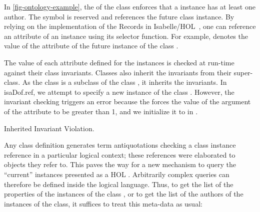 \begin{isabellebody}
\begin{isamarkuptext}
  In \autoref{fig-ontology-example}, the  of the class  
  enforces that a  instance has at least one author.
  The \isa{{\isasymsigma}} symbol is reserved and references the future class instance.
  By relying on the implementation of the Records
  in Isabelle/HOL~\cite{wenzel:isabelle-isar:2020},
  one can reference an attribute of an instance using its selector function.
  For example,  denotes the value
  of the attribute 
  of the future instance of the class .
\end{isamarkuptext}\isamarkuptrue%

\begin{isamarkuptext}
The value of each attribute defined for the instances is checked at run-time
  against their class invariants.
  Classes also inherit the invariants from their super-class.
  As the class  is a subclass
  of the class , it inherits the  invariants.
  In \csname isaDof.ref,
  we attempt to specify a new instance  of the class .
  However, the invariant checking triggers an error because
  the  forces the value of the argument
  of the attribute  to be greater than 1,
  and we initialize it to  in .
\end{isamarkuptext}\isamarkuptrue%

\begin{isamarkupfigure*}
[label = {inherited-invariant-checking-figure},type = {Isa_COL.figure}, args={label = {inherited-invariant-checking-figure},type = {Isa_COL.figure}, Isa_COL.figure.relative_width = {99}, Isa_COL.figure.src = {figures/inherited-invariant-checking-violated-example}, Isa_COL.figure.spawn_columns = {True}}]Inherited Invariant Violation.
\end{isamarkupfigure*}\isamarkuptrue%

\begin{isamarkuptext}
Any class definition generates term antiquotations checking a class instance reference
  in a particular logical context; these references were
  elaborated to objects they refer to.
  This paves the way for a new mechanism to query the ``current'' instances presented
  as a HOL .
  Arbitrarily complex queries can therefore be defined inside the logical language.
  Thus, to get the list of the properties of the instances of the class ,
  or to get the list of the authors of the instances of the   class,
  it suffices to treat this meta-data as usual:
  

\end{isamarkuptext}
\end{isabellebody}
